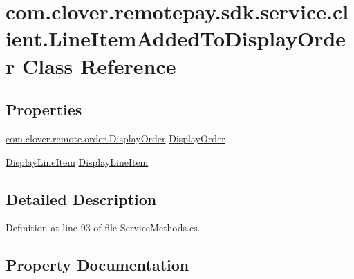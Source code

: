 \hypertarget{classcom_1_1clover_1_1remotepay_1_1sdk_1_1service_1_1client_1_1_line_item_added_to_display_order}{}\section{com.\+clover.\+remotepay.\+sdk.\+service.\+client.\+Line\+Item\+Added\+To\+Display\+Order Class Reference}
\label{classcom_1_1clover_1_1remotepay_1_1sdk_1_1service_1_1client_1_1_line_item_added_to_display_order}
\subsection*{Properties}
\begin{DoxyCompactItemize}
\item 
\hyperlink{classcom_1_1clover_1_1remote_1_1order_1_1_display_order}{com.\+clover.\+remote.\+order.\+Display\+Order} \hyperlink{classcom_1_1clover_1_1remotepay_1_1sdk_1_1service_1_1client_1_1_line_item_added_to_display_order_aa5e0f11e299ffcd42693a4b5c831a919}{Display\+Order}
\item 
\hyperlink{classcom_1_1clover_1_1remote_1_1order_1_1_display_line_item}{Display\+Line\+Item} \hyperlink{classcom_1_1clover_1_1remotepay_1_1sdk_1_1service_1_1client_1_1_line_item_added_to_display_order_a19e970e9bb70bd18769bbaad5612cd95}{Display\+Line\+Item}
\end{DoxyCompactItemize}


\subsection{Detailed Description}


Definition at line 93 of file Service\+Methods.\+cs.



\subsection{Property Documentation}
\mbox{\label{classcom_1_1clover_1_1remotepay_1_1sdk_1_1service_1_1client_1_1_line_item_added_to_display_order_a19e970e9bb70bd18769bbaad5612cd95}} 
